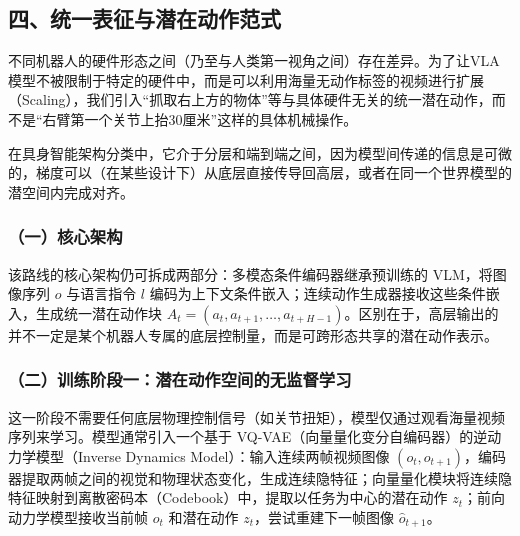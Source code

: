 \hypertarget{ux56dbux7edfux4e00ux8868ux5f81ux4e0eux6f5cux5728ux52a8ux4f5cux8303ux5f0f}{%
\subsection{四、统一表征与潜在动作范式}\label{ux56dbux7edfux4e00ux8868ux5f81ux4e0eux6f5cux5728ux52a8ux4f5cux8303ux5f0f}}

不同机器人的硬件形态之间（乃至与人类第一视角之间）存在差异。为了让VLA模型不被限制于特定的硬件中，而是可以利用海量无动作标签的视频进行扩展（Scaling），我们引入``抓取右上方的物体''等与具体硬件无关的统一潜在动作，而不是``右臂第一个关节上抬30厘米''这样的具体机械操作。

在具身智能架构分类中，它介于分层和端到端之间，因为模型间传递的信息是可微的，梯度可以（在某些设计下）从底层直接传导回高层，或者在同一个世界模型的潜空间内完成对齐。

\hypertarget{ux4e00ux6838ux5fc3ux67b6ux6784}{%
\subsubsection{（一）核心架构}\label{ux4e00ux6838ux5fc3ux67b6ux6784}}

该路线的核心架构仍可拆成两部分：多模态条件编码器继承预训练的 VLM，将图像序列 \(o\) 与语言指令 \(l\) 编码为上下文条件嵌入；连续动作生成器接收这些条件嵌入，生成统一潜在动作块 \(A_t=(a_t,a_{t+1},\ldots,a_{t+H-1})\)。区别在于，高层输出的并不一定是某个机器人专属的底层控制量，而是可跨形态共享的潜在动作表示。

\hypertarget{ux4e8cux8badux7ec3ux9636ux6bb5ux4e00ux6f5cux5728ux52a8ux4f5cux7a7aux95f4ux7684ux65e0ux76d1ux7763ux5b66ux4e60}{%
\subsubsection{（二）训练阶段一：潜在动作空间的无监督学习}\label{ux4e8cux8badux7ec3ux9636ux6bb5ux4e00ux6f5cux5728ux52a8ux4f5cux7a7aux95f4ux7684ux65e0ux76d1ux7763ux5b66ux4e60}}

这一阶段不需要任何底层物理控制信号（如关节扭矩），模型仅通过观看海量视频序列来学习。模型通常引入一个基于 VQ-VAE（向量量化变分自编码器）的逆动力学模型（Inverse Dynamics Model）：输入连续两帧视频图像 \((o_t,o_{t+1})\)，编码器提取两帧之间的视觉和物理状态变化，生成连续隐特征；向量量化模块将连续隐特征映射到离散密码本（Codebook）中，提取以任务为中心的潜在动作 \(z_t\)；前向动力学模型接收当前帧 \(o_t\) 和潜在动作 \(z_t\)，尝试重建下一帧图像 \(\hat{o}_{t+1}\)。

